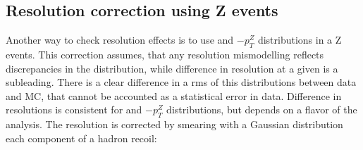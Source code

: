 \subsection{Resolution correction using Z events}
Another way to check resolution effects is to use \uperp and \upar  $ - p_T^{Z}$ distributions in a Z events. This correction assumes, that any resolution mismodelling reflects discrepancies in the \sumet distribution, while difference in resolution at a given \sumet is a subleading. There is a clear difference in a rms of this distributions between data and MC, that cannot be accounted as a statistical error in data. Difference in resolutions is consistent for \uperp and \upar $- p_T^{Z}$ distributions, but depends on a flavor of the analysis.  The resolution is corrected by smearing with a Gaussian distribution each component of a hadron recoil:

\begin{figure}[!tbp]
\begin{minipage}[h]{0.40\linewidth}
\end{minipage}
\hfill
\begin{minipage}[h]{0.40\linewidth}
\end{minipage}
\vfill
\begin{minipage}[h]{0.40\linewidth}
\end{minipage}
\hfill
\begin{minipage}[h]{0.40\linewidth}
\end{minipage}
\vfill
\begin{minipage}[h]{0.40\linewidth}
\end{minipage}
\hfill
\begin{minipage}[h]{0.40\linewidth}
\end{minipage}
\caption{}
\label{HadrRecoil:CorrSumet}
\end{figure}


